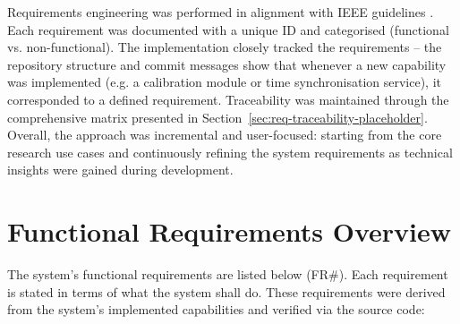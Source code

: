Requirements engineering was performed in alignment with IEEE guidelines \citep{ref11}. Each requirement was documented with a unique ID and categorised (functional vs. non-functional). The implementation closely tracked the requirements -- the repository structure and commit messages show that whenever a new capability was implemented (e.g. a calibration module or time synchronisation service), it corresponded to a defined requirement. Traceability was maintained through the comprehensive matrix presented in Section~\ref{sec:req-traceability-placeholder}. Overall, the approach was incremental and user-focused: starting from the core research use cases and continuously refining the system requirements as technical insights were gained during development.

\label{sec:req-traceability-placeholder}


\section{Functional Requirements Overview}
The system's functional requirements are listed below (FR\#). Each requirement is stated in terms of what the system shall do. These requirements were derived from the system's implemented capabilities and verified via the source code:


